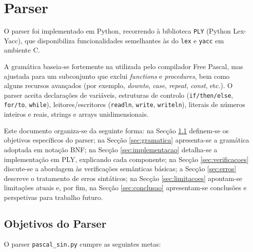 \chapter{Parser}

O parser foi implementado em Python, recorrendo à biblioteca {\tt PLY} (Python Lex-Yacc), que disponibiliza funcionalidades semelhantes às do \texttt{lex} e \texttt{yacc} em ambiente C.

A gramática baseia-se fortemente na utilizada pelo compilador Free Pascal, mas ajustada para um subconjunto que exclui \emph{functions} e \emph{procedures}, bem como alguns recursos avançados (por exemplo, \emph{downto}, \emph{case}, \emph{repeat}, \emph{const}, etc.). O parser aceita declarações de variáveis, estruturas de controlo (\texttt{if/then/else}, \texttt{for/to}, \texttt{while}), leitores/escritores (\texttt{readln}, \texttt{write}, \texttt{writeln}), literais de números inteiros e reais, strings e arrays unidimensionais.

Este documento organiza-se da seguinte forma: na Secção \ref{sec:objetivos} definem-se os objetivos específi\-cos do parser; na Secção \ref{sec:gramatica} apresenta-se a gramática adoptada em notação BNF; na Secção \ref{sec:implementacao} detalha-se a implementação em PLY, explicando cada componente; na Secção \ref{sec:verificacoes} discute-se a abordagem às verificações semânticas básicas; a Secção \ref{sec:erros} descreve o tratamento de erros sintáticos; na Secção \ref{sec:limitacoes} apontam-se limitações atuais e, por fim, na Secção \ref{sec:conclusao} apresentam-se conclusões e perspetivas para trabalho futuro.

\section{Objetivos do Parser}
\label{sec:objetivos}

O parser \texttt{pascal\_sin.py} cumpre as seguintes metas:

